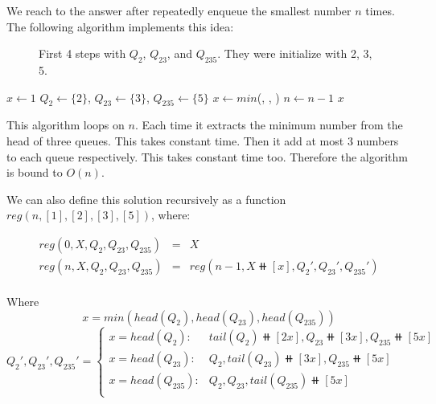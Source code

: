 \documentclass[b5paper]{article}
\begin{document}
We reach to the answer after repeatedly enqueue the smallest number $n$ times. The following algorithm implements this idea:

\begin{figure}[htbp]
  \centering
  \caption{First 4 steps with $Q_2$, $Q_{23}$, and $Q_{235}$. They were initialize with 2, 3, 5.}
  \label{fig:q235}
\end{figure}

\begin{algorithmic}[1]
  \State $x \gets 1$
  \State $Q_2 \gets \{ 2 \}$, $Q_{23} \gets \{ 3 \}$, $Q_{235} \gets \{ 5 \}$
    \State $x \gets min$(, , )
      \State {}
      \State {}
      \State {}
      \State {}
      \State {}
      \State {}
      \State {}
    \Else
      \State {}
      \State {}
    \EndIf
    \State $n \gets n - 1$
  \EndWhile
  \State \Return $x$
\EndFunction
\end{algorithmic}

This algorithm loops on $n$. Each time it extracts the minimum number from the head of three queues. This takes constant time. Then it add at most 3 numbers to each queue respectively. This takes constant time too. Therefore the algorithm is bound to $O(n)$.

We can also define this solution recursively as a function $reg(n, [1], [2], [3], [5])$, where:

\[
\begin{array}{rcl}
reg(0, X, Q_2, Q_{23}, Q_{235}) & = & X \\
reg(n, X, Q_2, Q_{23}, Q_{235}) & = & reg(n - 1, X \doubleplus [x], Q_2', Q_{23}', Q_{235}') \\
\end{array}
\]

Where
\[
 x = min(head(Q_2), head(Q_{23}), head(Q_{235}))
\]
\[
 Q_2', Q_{23}', Q_{235}' = \begin{cases}
 x = head(Q_2) : & tail(Q_2) \doubleplus [2x], Q_{23} \doubleplus [3x], Q_{235} \doubleplus [5x] \\
 x = head(Q_{23}) : & Q_2, tail(Q_{23}) \doubleplus [3x], Q_{235} \doubleplus [5x] \\
 x = head(Q_{235}) : & Q_2, Q_{23}, tail(Q_{235}) \doubleplus [5x] \\
\end{cases}
\]
\end{document}
